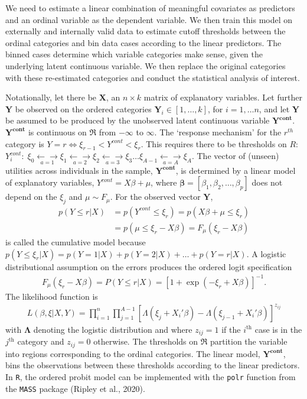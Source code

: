 \documentclass[12pt,econ]{sources/authesis}
\begin{document}
\vspace{-0.4cm}

We need to estimate a linear combination of meaningful covariates as predictors and an ordinal variable as the dependent variable. We then train this model on externally and internally valid data to estimate cutoff thresholds between the ordinal categories and bin data cases according to the linear predictors. The binned cases determine which variable categories make sense, given the underlying latent continuous variable. We then replace the original categories with these re-estimated categories and conduct the statistical analysis of interest.

Notationally, let there be \(\bm{X}\), an \(n \times k\) matrix of explanatory variables. Let further \(\bm{Y}\) be observed on the ordered categories \(\bm{Y}_i \in [1,\ldots,k]\), for \(i=1,\ldots n\), and let \(\bm{Y}\) be assumed to be produced by the unobserved latent continuous variable \(\bm{Y^{cont}}\). \(\bm{Y^{cont}}\) is continuous on \(\mathfrak{R}\) from \(-\infty\) to \(\infty\). The `response mechanism' for the \(r^{th}\) category is \(Y=r \Longleftrightarrow \xi_{r-1} < Y^{cont} < \xi_r\). This requires there to be thresholds on \(R\):
\(Y^{cont}_i: \; \xi_0 \underset{a=1}{\longleftarrow\!\longrightarrow} \xi_1 \underset{a=2}{\longleftarrow\!\longrightarrow} \xi_2 \underset{a=3}{\longleftarrow\!\longrightarrow} \xi_3\ldots \xi_{A-1} \underset{a=A}{\longleftarrow\!\longrightarrow} \xi_A\). The vector of (unseen) utilities across individuals in the sample, \(\bm{Y^{cont}}\), is determined by a linear model of explanatory variables, \(Y^{cont} = X \beta + \mu\), where \(\bm{\beta} =[\beta_1,\beta_2,\ldots,\beta_p]\) does not depend on the \(\xi_j\) and \(\mu \sim F_{\mu}\). For the observed vector \(\bm{Y}\),
\begin{align}
p(Y \leq r|X) &= p(Y^{cont} \leq \xi_r) = p(X \beta + \mu \leq \xi_r) \nonumber\\
&= p(\mu \leq \xi_r - X \beta) = F_{\mu}(\xi_r - X \beta)
\end{align}
is called the cumulative model because \(p(Y \leq \xi_r|X) = p(Y=1|X) + p(Y=2|X) + \ldots + p(Y=r|X)\). A logistic distributional assumption on the errors produces the ordered logit specification
\begin{align}
F_{\mu}(\xi_r - X \beta) = P(Y \leq r|X) = [1+\exp(-\xi_r + X \beta)]^{-1}. 
\end{align}
The likelihood function is
\begin{align}
L(\beta, \xi|X,Y) = \prod_{i=1}^{n}\prod_{j=1}^{A-1}\left[\Lambda(\xi_j + X_i' \beta) - \Lambda(\xi_{j-1} + X_i' \beta) \right]^{z_{ij}}
\end{align}
with \(\bm{\Lambda}\) denoting the logistic distribution and where \(z_{ij}=1\) if the \(i^\text{th}\) case is in the \(j^\text{th}\) category and \(z_{ij}=0\) otherwise. The thresholds on \(\mathfrak{R}\) partition the variable into regions corresponding to the ordinal categories. The linear model, \(\bm{Y^{cont}}\), bins the observations between these thresholds according to the linear predictors. In \texttt{R}, the ordered probit model can be implemented with the \texttt{polr} function from the \texttt{MASS} package (Ripley et al., 2020).
\end{document}
